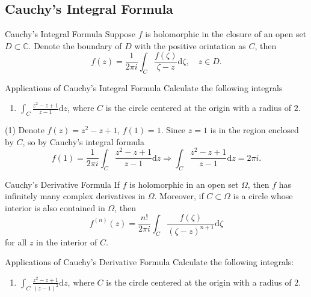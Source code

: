 \subsection{Cauchy's Integral Formula}

\begin{theorem}{Cauchy's Integral Formula}{}
  Suppose $f$ is holomorphic in the closure of an open set $D \subset \mathbb{C}$.
  Denote the boundary of $D$ with the positive orintation as $C$, then
  \begin{equation}
    f(z) = \frac{1}{2 \pi i} \int_C \frac{f(\zeta)}{\zeta - z}\mathrm{d} \zeta, \quad
    z \in D.
  \end{equation}
\end{theorem}

\begin{example}{Applications of Cauchy's Integral Formula}{}
  Calculate the following integrals
  \begin{enumerate}
  \item $\int_C \frac{z^2 - z + 1}{z - 1}\mathrm{d} z$,
    where $C$ is the circle centered at the origin with a radius of $2$.
  \end{enumerate}
\end{example}

\begin{solution}
  (1) Denote $f(z) = z^2 - z + 1$, $f(1) = 1$.
  Since $z = 1$ is in the region enclosed by $C$, so by Cauchy's integral formula
  \begin{equation}
    f(1) = \frac{1}{2\pi i}\int_C \frac{z^2 - z + 1}{z - 1}\mathrm{d} z
    \Rightarrow \int_C \frac{z^2 - z + 1}{z - 1}\mathrm{d}z = 2 \pi i.
  \end{equation}
\end{solution}

\begin{corollary}{Cauchy's Derivative Formula}{}
  If $f$ is holomorphic in an open set $\Omega$,
  then $f$ has infinitely many complex derivatives in $\Omega$.
  Moreover, if $C \subset \Omega$ is a circle whose interior is also contained in $\Omega$,
  then
  \begin{equation}
    f^{(n)}(z) = \frac{n!}{2 \pi i} \int_C \frac{f(\zeta)}{(\zeta - z)^{n+1}}\mathrm{d} \zeta
  \end{equation}
  for all $z$ in the interior of $C$.
\end{corollary}

\begin{example}{Applications of Cauchy's Derivative Formula}{}
  Calculate the following integrals:
  \begin{enumerate}
  \item $\int_C \frac{z^2 - z + 1}{(z-1)^2}\mathrm{d} z$,
    where $C$ is the circle centered at the origin with a radius of $2$.
  \end{enumerate}
\end{example}

